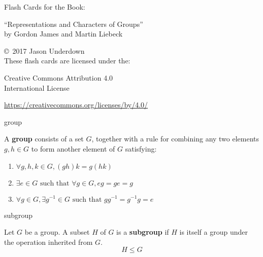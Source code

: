 \documentclass[avery5371,grid]{flashcards}
\newcommand{\st}{\textrm{ such that }}
\renewcommand{\le}{\leqslant}
\newcommand{\defn}[1]{\textbf{#1}}
\begin{document}



\begin{flashcard}[Copying]
  { Flash Cards for the Book:

    \begin{center}
      ``Representations and Characters of Groups'' \\
      by Gordon James and Martin Liebeck
    \end{center}
  }
  \copyright\ 2017 Jason Underdown \\

  These flash cards are licensed under the:
  \begin{center}
    Creative Commons Attribution 4.0 \\
    International License \\
    \ccby
  \end{center}
  \url{https://creativecommons.org/licenses/by/4.0/}
\end{flashcard}

\begin{flashcard}[Definition]{group}

  A \defn{group} consists of a set $G$, together with a rule for
  combining any two elements $g, h \in G$ to form another element of
  $G$ satisfying:
  \begin{enumerate}
  \item $\forall g,h,k \in G, (gh)k = g(hk)$
  \item $\exists e \in G \st \forall g \in G, eg=ge=g$
  \item $\forall g \in G, \exists g^{-1} \in G \st gg^{-1} = g^{-1}g = e$
  \end{enumerate}

\end{flashcard}

\begin{flashcard}[Definition]{subgroup}

Let $G$ be a group. A subset $H$ of $G$ is a \defn{subgroup} if $H$ is
itself a group under the operation inherited from $G$.
\[
  H \le G
\]

\end{flashcard}
\end{document}
